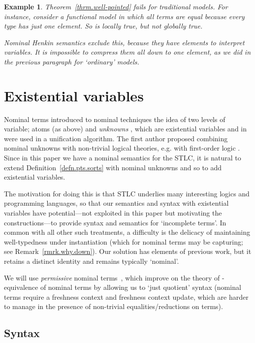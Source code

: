 \documentclass[submission,copyright]{eptcs}
\newtheorem{xmpl}[thrm]{Example}
\begin{document}
\begin{xmpl}
\label{xmpl.one.point}
Theorem~\ref{thrm.well-pointed} fails for traditional models.
For instance, consider a functional model in which all terms are equal because every type has just one element.
So  is locally true, but not globally true.

Nominal Henkin semantics exclude this, because they have elements to interpret variables.
It is impossible to compress them all down to one element, as we did in the previous paragraph for `ordinary' models. 
\end{xmpl}


\section{Existential variables}
\label{sect.existential.variables}

Nominal terms introduced to nominal techniques the idea of two levels of variable; atoms (as above) and \emph{unknowns} , which are existential variables and in \cite{gabbay:nomu-jv} were used in a unification algorithm. 
The first author proposed combining nominal unknowns with non-trivial logical theories, e.g. with first-order logic \cite{gabbay:oneaah,gabbay:oneaah-jv}.
Since in this paper we have a nominal semantics for the STLC, it is natural to extend Definition~\ref{defn.pts.sorts} with nominal unknowns and so to add existential variables.

The motivation for doing this is that STLC underlies many interesting logics and programming languages, so that our semantics and syntax with existential variables have potential---not exploited in this paper but motivating the constructions---to provide syntax and semantics for `incomplete terms'.
In common with all other such treatments, a difficulty is the delicacy of maintaining well-typedness under instantiation (which for nominal terms may be capturing; see Remark~\ref{rmrk.why.down}).
Our solution has elements of previous work, but it retains a distinct identity and remains typically `nominal'.

We will use \emph{permissive} nominal terms~\cite{gabbay:perntu-jv}, which improve on the theory of -equivalence of nominal terms by allowing us to `just quotient' syntax (nominal terms require a freshness context and freshness context update, which are harder to manage in the presence of non-trivial equalities/reductions on terms). 
\subsection{Syntax}
\label{subsect.syntax} 
\end{document}
